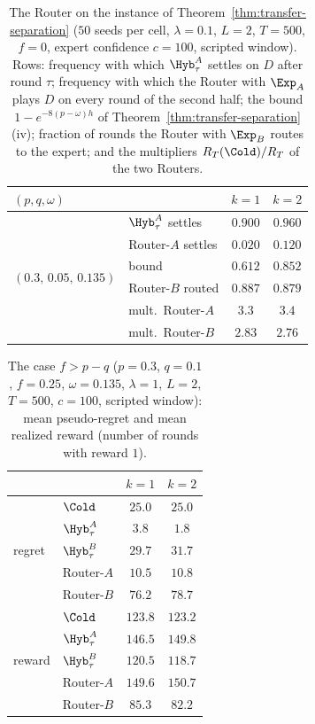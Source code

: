 \begin{table}[h]
\centering
\caption{The Router on the instance of Theorem~\ref{thm:transfer-separation} ($50$ seeds per cell, $\lambda=0.1$, $L=2$, $T=500$, $f=0$, expert confidence $c=100$, scripted window). Rows: frequency with which $\Hyb^A_\tau$ settles on $D$ after round $\tau$; frequency with which the Router with $\Exp_A$ plays $D$ on every round of the second half; the bound $1-e^{-8(p-\omega)h}$ of Theorem~\ref{thm:transfer-separation}(iv); fraction of rounds the Router with $\Exp_B$ routes to the expert; and the multipliers $R_T(\Cold)/R_T$ of the two Routers.}
\label{tab:router-check}
\small
\begin{tabular}{@{}llcc@{}}
\toprule
$(p,q,\omega)$ & & $k=1$ & $k=2$ \\
\midrule
\multirow{6}{*}{$(0.3,\,0.05,\,0.135)$} & $\Hyb^A_\tau$ settles & $0.900$ & $0.960$ \\
 & Router-$A$ settles & $0.020$ & $0.120$ \\
 & bound & $0.612$ & $0.852$ \\
 & Router-$B$ routed & $0.887$ & $0.879$ \\
 & mult.\ Router-$A$ & $3.3$ & $3.4$ \\
 & mult.\ Router-$B$ & $2.83$ & $2.76$ \\
\bottomrule
\end{tabular}
\end{table}

\begin{table}[h]
\centering
\caption{The case $f>p-q$ ($p=0.3$, $q=0.1$, $f=0.25$, $\omega=0.135$, $\lambda=1$, $L=2$, $T=500$, $c=100$, scripted window): mean pseudo-regret and mean realized reward (number of rounds with reward $1$).}
\label{tab:router-fgt}
\small
\begin{tabular}{@{}llcc@{}}
\toprule
 & & $k=1$ & $k=2$ \\
\midrule
\multirow{5}{*}{regret} & $\Cold$ & $25.0$ & $25.0$ \\
 & $\Hyb^A_\tau$ & $3.8$ & $1.8$ \\
 & $\Hyb^B_\tau$ & $29.7$ & $31.7$ \\
 & Router-$A$ & $10.5$ & $10.8$ \\
 & Router-$B$ & $76.2$ & $78.7$ \\
\midrule
\multirow{5}{*}{reward} & $\Cold$ & $123.8$ & $123.2$ \\
 & $\Hyb^A_\tau$ & $146.5$ & $149.8$ \\
 & $\Hyb^B_\tau$ & $120.5$ & $118.7$ \\
 & Router-$A$ & $149.6$ & $150.7$ \\
 & Router-$B$ & $85.3$ & $82.2$ \\
\bottomrule
\end{tabular}
\end{table}
